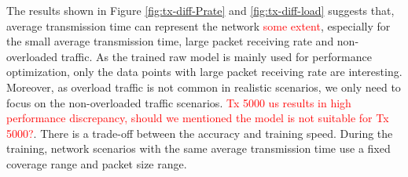  The results shown in Figure \ref{fig:tx-diff-Prate} and  \ref{fig:tx-diff-load}  suggests that, average transmission time can represent the network \textcolor{red}{some extent}, especially for the small average transmission time, large packet receiving rate and non-overloaded traffic. As the trained \gls{raw} model is mainly used for performance optimization, only the data points with large packet receiving rate are interesting.
 Moreover, as overload traffic is not common in realistic scenarios, we only need to focus on the non-overloaded traffic scenarios. \textcolor{red}{Tx 5000 us results in high performance discrepancy, should we mentioned the model is not suitable for Tx 5000?}. 
 There is a trade-off between the accuracy and training speed. During the training, network scenarios with the same average transmission time use a fixed coverage range and packet size range. 








